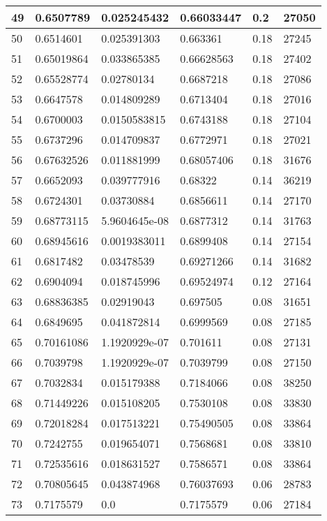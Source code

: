 \begin{longtable}{|l|l|l|l|l|l|}
49 & 0.6507789 & 0.025245432 & 0.66033447 & 0.2 & 27050 \\ \hline 
50 & 0.6514601 & 0.025391303 & 0.663361 & 0.18 & 27245 \\ \hline 
51 & 0.65019864 & 0.033865385 & 0.66628563 & 0.18 & 27402 \\ \hline 
52 & 0.65528774 & 0.02780134 & 0.6687218 & 0.18 & 27086 \\ \hline 
53 & 0.6647578 & 0.014809289 & 0.6713404 & 0.18 & 27016 \\ \hline 
54 & 0.6700003 & 0.0150583815 & 0.6743188 & 0.18 & 27104 \\ \hline 
55 & 0.6737296 & 0.014709837 & 0.6772971 & 0.18 & 27021 \\ \hline 
56 & 0.67632526 & 0.011881999 & 0.68057406 & 0.18 & 31676 \\ \hline 
57 & 0.6652093 & 0.039777916 & 0.68322 & 0.14 & 36219 \\ \hline 
58 & 0.6724301 & 0.03730884 & 0.6856611 & 0.14 & 27170 \\ \hline 
59 & 0.68773115 & 5.9604645e-08 & 0.6877312 & 0.14 & 31763 \\ \hline 
60 & 0.68945616 & 0.0019383011 & 0.6899408 & 0.14 & 27154 \\ \hline 
61 & 0.6817482 & 0.03478539 & 0.69271266 & 0.14 & 31682 \\ \hline 
62 & 0.6904094 & 0.018745996 & 0.69524974 & 0.12 & 27164 \\ \hline 
63 & 0.68836385 & 0.02919043 & 0.697505 & 0.08 & 31651 \\ \hline 
64 & 0.6849695 & 0.041872814 & 0.6999569 & 0.08 & 27185 \\ \hline 
65 & 0.70161086 & 1.1920929e-07 & 0.701611 & 0.08 & 27131 \\ \hline 
66 & 0.7039798 & 1.1920929e-07 & 0.7039799 & 0.08 & 27150 \\ \hline 
67 & 0.7032834 & 0.015179388 & 0.7184066 & 0.08 & 38250 \\ \hline 
68 & 0.71449226 & 0.015108205 & 0.7530108 & 0.08 & 33830 \\ \hline 
69 & 0.72018284 & 0.017513221 & 0.75490505 & 0.08 & 33864 \\ \hline 
70 & 0.7242755 & 0.019654071 & 0.7568681 & 0.08 & 33810 \\ \hline 
71 & 0.72535616 & 0.018631527 & 0.7586571 & 0.08 & 33864 \\ \hline 
72 & 0.70805645 & 0.043874968 & 0.76037693 & 0.06 & 28783 \\ \hline 
73 & 0.7175579 & 0.0 & 0.7175579 & 0.06 & 27184 \\ \hline 

\end{longtable}
